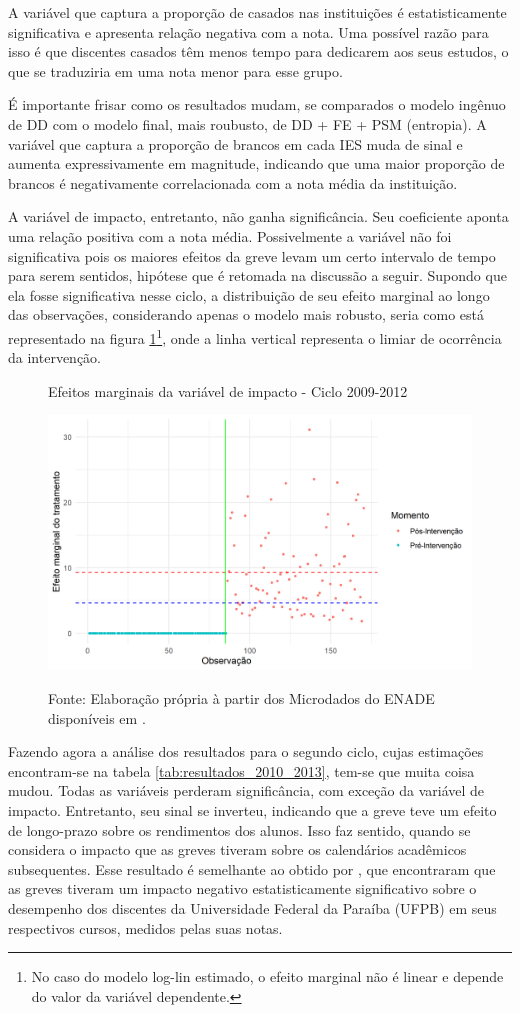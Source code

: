 A variável que captura a proporção de casados nas instituições é estatisticamente significativa e apresenta relação negativa com a nota. Uma possível razão para isso é que discentes casados têm menos tempo para dedicarem aos seus estudos, o que se traduziria em uma nota menor para esse grupo.

É importante frisar como os resultados mudam, se comparados o modelo ingênuo de DD com o modelo final, mais roubusto, de DD + FE + PSM (entropia). A variável que captura a proporção de brancos em cada IES muda de sinal e aumenta expressivamente em magnitude, indicando que uma maior proporção de brancos é negativamente correlacionada com a nota média da instituição. 

A variável de impacto, entretanto, não ganha significância. Seu coeficiente aponta uma relação positiva com a nota média. Possivelmente a variável não foi significativa pois os maiores efeitos da greve levam um certo intervalo de tempo para serem sentidos, hipótese que é retomada na discussão a seguir. Supondo que ela fosse significativa nesse ciclo, a distribuição de seu efeito marginal ao longo das observações, considerando apenas o modelo mais robusto, seria como está representado na figura \ref{fig:Efeitos_marginais_2009_2012}\footnote{No caso do modelo log-lin estimado, o efeito marginal não é linear e depende do valor da variável dependente.}, onde a linha vertical representa o limiar de ocorrência da intervenção.

\begin{figure}[H]
	\centering
	\caption{Efeitos marginais da variável de impacto - Ciclo 2009-2012}
	\label{fig:Efeitos_marginais_2009_2012}
	\includegraphics[width=0.7\linewidth]{"Figuras/Efeitos_marginais_2009_2012.png"} \\
\caption*{\RaggedRight Fonte: Elaboração própria à partir dos Microdados do ENADE disponíveis em \cite{INEP2020}.}
\end{figure}

Fazendo agora a análise dos resultados para o segundo ciclo, cujas estimações encontram-se na tabela \ref{tab:resultados_2010_2013}, tem-se que muita coisa mudou. Todas as variáveis perderam significância, com exceção da variável de impacto. Entretanto, seu sinal se inverteu, indicando que a greve teve um efeito de longo-prazo sobre os rendimentos dos alunos. Isso faz sentido, quando se considera o impacto que as greves tiveram sobre os calendários acadêmicos subsequentes. Esse resultado é semelhante ao obtido por , que encontraram que as greves tiveram um impacto negativo estatisticamente significativo sobre o desempenho dos discentes da Universidade Federal da Paraíba (UFPB) em seus respectivos cursos, medidos pelas suas notas.

